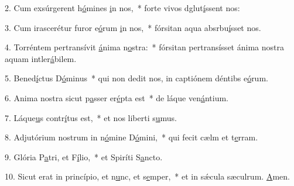 2. Cum exsúrgerent h\uline{ó}mines \uline{i}n nos,~* forte vivos dglut\uline{í}ssent nos:\par 
3. Cum irascerétur furor e\uline{ó}rum \uline{i}n nos,~* fórsitan aqua absrbu\uline{í}sset nos.\par 
4. Torréntem pertransívit \uline{á}nima n\uline{o}stra:~* fórsitan pertransísset ánima nostra aquam intler\uline{á}bilem.\par 
5. Bened\uline{í}ctus D\uline{ó}minus~* qui non dedit nos, in captiónem déntibs e\uline{ó}rum.\par 
6. Anima nostra sicut p\uline{a}sser er\uline{é}pta est~* de láque ven\uline{á}ntium.\par 
7. Láque\uline{u}s contr\uline{í}tus est,~* et nos liberti s\uline{u}mus.\par 
8. Adjutórium nostrum in n\uline{ó}mine D\uline{ó}mini,~* qui fecit cælm et t\uline{e}rram.\par 
9. Glória P\uline{a}tri, et F\uline{í}lio,~* et Spiríti S\uline{a}ncto.\par 
10. Sicut erat in princípio, et n\uline{u}nc, et s\uline{e}mper,~* et in sǽcula sæculrum. \uline{A}men.\par 
